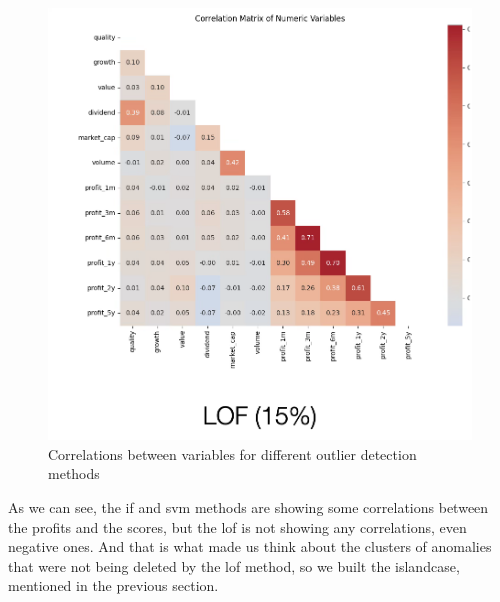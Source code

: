 \documentclass[11pt,english,a4paper,hidelinks]{book}
\begin{document}
\begin{figure}[H]
\begin{minipage}{0.32\textwidth}
    \end{minipage}
    \hfill
    \begin{minipage}{0.32\textwidth}
        \centering
        \includegraphics[width=\textwidth]{images/code/outliers/LOF 15.png}
    \end{minipage}
    \caption{Correlations between variables for different outlier detection methods}
    \label{fig:island_cases_examples}
\end{figure}

\noindent As we can see, the \acrshort{if} and \acrshort{svm} methods are showing some correlations between the profits and the scores, but the \acrshort{lof} is not showing any correlations, even negative ones. And that is what made us think about the clusters of anomalies that were not being deleted by the \acrshort{lof} method, so we built the \acrshort{islandcase}, mentioned in the previous section.





\end{document}

